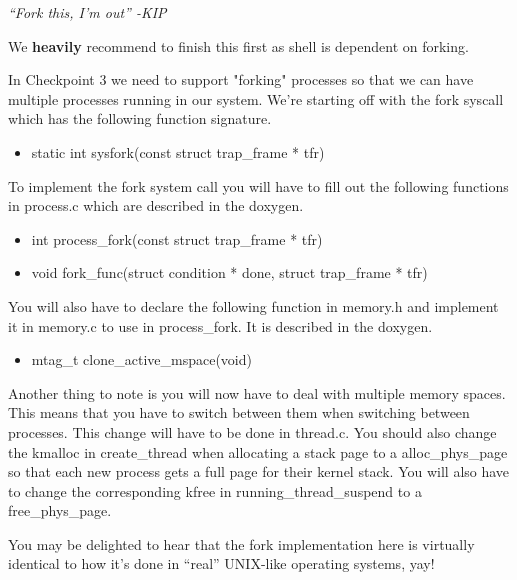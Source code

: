 \documentclass{article}
\begin{document}
	\emph{``Fork this, I'm out'' -KIP}
	
	We \textbf{heavily} recommend to finish this first as {\fix shell} is dependent on {\fix forking}.

	In Checkpoint 3 we need to support "forking" processes so that we can have multiple processes running in our system.
	We're starting off with the {\fix fork} syscall which has the following function signature.

	\begin{itemize}
		\item{\fix static int sysfork(const struct trap\_frame * tfr)}
	\end{itemize}

	To implement the fork system call you will have to fill out the following functions in {\fix process.c} which are described in the doxygen.
	\begin{itemize}
		\item{\fix int process\_fork(const struct trap\_frame * tfr)}
		\item {\fix void fork\_func(struct condition * done, struct trap\_frame * tfr)}
	\end{itemize}
	
	
	You will also have to declare the following function in {\fix memory.h} and implement it in {\fix memory.c} to use in {\fix process\_fork}. It is described in the doxygen.
	\begin{itemize}
        \item{\fix mtag\_t clone\_active\_mspace(void)}
    \end{itemize}

	Another thing to note is you will now have to deal with multiple memory spaces. This means that you have to switch between them when switching between processes. 
	This change will have to be done in {\fix thread.c}. You should also change the {\fix kmalloc} in {\fix create\_thread} when allocating a stack page to a {\fix alloc\_phys\_page} so that
	each new process gets a full page for their kernel stack. 
	You will also have to change the corresponding {\fix kfree} in {\fix running\_thread\_suspend} to a {\fix free\_phys\_page}. 


	You may be delighted to hear that the {\fix fork} implementation here is virtually identical to how it's done in ``real'' UNIX-like operating systems, yay!
\end{document}
